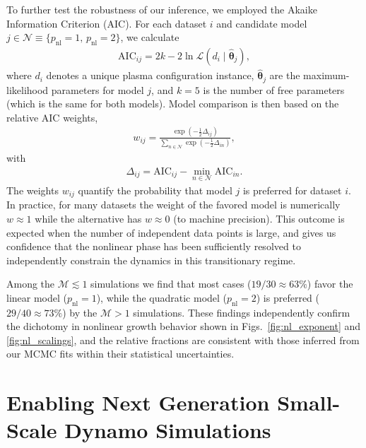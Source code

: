 \documentclass[12pt,twoside]{extreport}
\newcommand{\rbrac}[1]{\left( #1 \right)} %
\newcommand{\mSonicMach}{\ensuremath{\mathcal{M}}} %
\begin{document}
    To further test the robustness of our inference, we employed the Akaike Information Criterion (AIC). For each dataset $i$ and candidate model \mbox{$j \in \mathcal{N} \equiv \{p_\mathrm{nl}=1, \,p_\mathrm{nl}=2\}$}, we calculate
    \begin{align}
        \mathrm{AIC}_{ij}
            = 2k - 2\ln \mathcal{L}(d_i \mid \bm{\hat{\theta}}_j) ,
    \end{align}
    where $d_i$ denotes a unique plasma configuration instance, $\bm{\hat{\theta}}_j$ are the maximum-likelihood parameters for model $j$, and $k = 5$ is the number of free parameters (which is the same for both models). Model comparison is then based on the relative AIC weights,
    \begin{align}
        w_{ij}
            = \frac{
                \exp\!\rbrac{-\tfrac{1}{2} \Delta_{ij}}
            }{
                \sum_{n \in \mathcal{N}} \exp\!\rbrac{-\tfrac{1}{2} \Delta_{in}}
            } ,
    \end{align}
    with
    \begin{align}
        \Delta_{ij}
            = \mathrm{AIC}_{ij} - \min_{n \in \mathcal{N}} \mathrm{AIC}_{in} .
    \end{align}
    The weights $w_{ij}$ quantify the probability that model $j$ is preferred for dataset $i$. In practice, for many datasets the weight of the favored model is numerically $w \approx 1$ while the alternative has $w \approx 0$ (to machine precision). This outcome is expected when the number of independent data points is large, and gives us confidence that the nonlinear phase has been sufficiently resolved to independently constrain the dynamics in this transitionary regime.

    Among the $\mSonicMach \lesssim 1$ simulations we find that most cases ($19/30 \approx 63\%$) favor the linear model ($p_\mathrm{nl} = 1$), while the quadratic model ($p_\mathrm{nl} = 2$) is preferred ($29/40 \approx 73\%$) by the $\mSonicMach > 1$ simulations. These findings independently confirm the dichotomy in nonlinear growth behavior shown in Figs.~\ref{fig:nl_exponent} and \ref{fig:nl_scalings}, and the relative fractions are consistent with those inferred from our MCMC fits within their statistical uncertainties.

    \chapter{Enabling Next Generation Small-Scale Dynamo Simulations}
\label{chapter:quokka}
\end{document}
